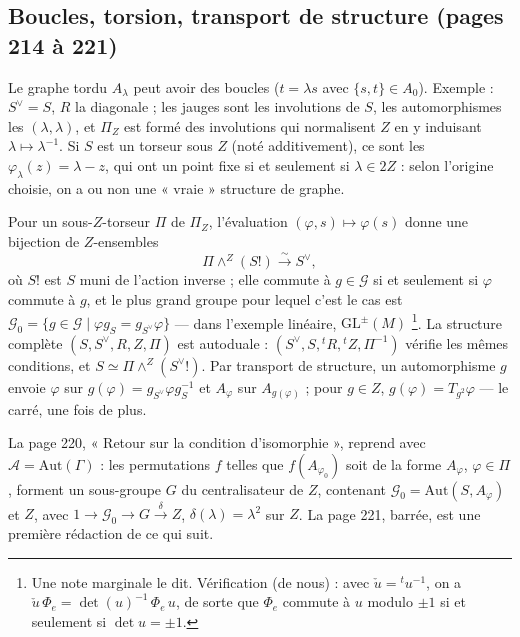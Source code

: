 \documentclass[11pt,a4paper]{article}
\begin{document}
\subsection*{Boucles, torsion, transport de structure (pages 214 à 221)}

Le graphe tordu $A_\lambda$ peut avoir des boucles ($t = \lambda s$ avec $\{s,
t\} \in A_0$). Exemple : $S^{\vee} = S$, $R$ la diagonale ; les jauges sont les
involutions de $S$, les automorphismes les $(\lambda, \lambda)$, et $\Pi_Z$ est
formé des involutions qui normalisent $Z$ en y induisant $\lambda \mapsto
\lambda^{-1}$. Si $S$ est un torseur sous $Z$ (noté additivement), ce sont les
$\varphi_\lambda(z) = \lambda - z$, qui ont un point fixe si et seulement si
$\lambda \in 2Z$ : selon l'origine choisie, on a ou non une « vraie »
structure de graphe.

Pour un sous-$Z$-torseur $\Pi$ de $\Pi_Z$, l'évaluation $(\varphi, s) \mapsto
\varphi(s)$ donne une bijection de $Z$-ensembles
\[
  \Pi \wedge^{Z} (S!) \xrightarrow{\ \sim\ } S^{\vee} ,
\]
où $S!$ est $S$ muni de l'action inverse ; elle commute à $g \in \mathcal{G}$
si et seulement si $\varphi$ commute à $g$, et le plus grand groupe pour lequel
c'est le cas est $\mathcal{G}_0 = \{g \in \mathcal{G} \mid \varphi g_S =
g_{S^{\vee}}\varphi\}$ --- dans l'exemple linéaire, $\mathrm{GL}^{\pm}(M)$
\footnote{Une note marginale le dit. Vérification (de nous) : avec $\check u =
{}^{t}u^{-1}$, on a $\check u\,\Phi_e = \det(u)^{-1}\,\Phi_e\, u$, de sorte que
$\Phi_e$ commute à $u$ modulo $\pm 1$ si et seulement si $\det u = \pm 1$.}. La
structure complète $(S, S^{\vee}, R, Z, \Pi)$ est autoduale : $(S^{\vee}, S,
{}^{t}R, {}^{t}Z, \Pi^{-1})$ vérifie les mêmes conditions, et $S \simeq \Pi
\wedge^{Z} (S^{\vee}!)$. Par transport de structure, un automorphisme $g$ envoie
$\varphi$ sur $g(\varphi) = g_{S^{\vee}}\varphi g_S^{-1}$ et $A_\varphi$ sur
$A_{g(\varphi)}$ ; pour $g \in Z$, $g(\varphi) = T_{g^2}\varphi$ --- le carré, une
fois de plus.

La page 220, « Retour sur la condition d'isomorphie », reprend avec $\mathcal{A}
= \mathrm{Aut}(\Gamma)$ : les permutations $f$ telles que $f(A_{\varphi_0})$ soit
de la forme $A_\varphi$, $\varphi \in \Pi$, forment un sous-groupe $G$ du
centralisateur de $Z$, contenant $\mathcal{G}_0 = \mathrm{Aut}(S, A_\varphi)$ et
$Z$, avec $1 \to \mathcal{G}_0 \to G \xrightarrow{\delta} Z$, $\delta(\lambda)
= \lambda^2$ sur $Z$. La page 221, barrée, est une première rédaction de ce qui
suit.
\end{document}

